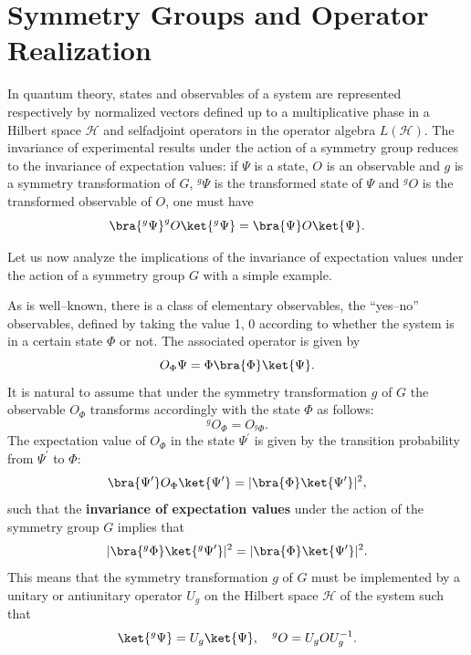 \begin{example}
\end{example}

\begin{example}
\end{example}

\section{Symmetry Groups and Operator Realization}

In quantum theory, states and observables of a system are represented respectively by normalized vectors defined up to a multiplicative phase in a Hilbert space \(\mathcal{H}\) and selfadjoint operators in the operator algebra \(L(\mathcal{H})\). The invariance of experimental results under the action of a symmetry group reduces to the invariance of expectation values: if \(\Psi\) is a state, \(O\) is an observable and \(g\) is a symmetry transformation of \(G\), \(^g \Psi\) is the transformed state of \(\Psi\) and \(^g O\) is the transformed observable of \(O\), one must have
\begin{equation}
    \bra{^g \Psi} ^g O \ket{^g \Psi} = \bra{\Psi} O \ket{\Psi}.
    \label{eq:group_invariance_expectation_value_definition}
\end{equation}

Let us now analyze the implications of the invariance of expectation values under the action of a symmetry group \(G\) with a simple example.

\begin{example}
    As is well–known, there is a class of elementary observables, the “yes–no” observables, defined by taking the value 1, 0 according to whether the system is in a certain state \(\Phi\) or not. The associated operator is given by
    \[
        O_{\Phi} \Psi = \Phi \bra{\Phi} \ket{\Psi}.
    \]
    It is natural to assume that under the symmetry transformation \(g\) of \(G\) the observable \(O_{\Phi}\) transforms accordingly with the state \(\Phi\) as follows:
    \[
        ^g O_{\Phi} = O_{^g \Phi}.
    \]
    The expectation value of \(O_{\Phi}\) in the state \(\Psi^{\prime}\) is given by the transition probability from \(\Psi^{\prime}\) to \(\Phi\):
    \[
        \bra{\Psi^{\prime}} O_{\Phi} \ket{\Psi^{\prime}} = |\bra{\Phi} \ket{\Psi^{\prime}}|^2,
    \]
    such that the \textbf{invariance of expectation values} under the action of the symmetry group \(G\) implies that
    \[
        |\bra{^g \Phi} \ket{^g \Psi^{\prime}}|^2 = |\bra{\Phi} \ket{\Psi^{\prime}}|^2.
    \]
    This means that the symmetry transformation \(g\) of \(G\) must be implemented by a unitary or antiunitary operator \(U_g\) on the Hilbert space \(\mathcal{H}\) of the system such that
    \[
        \ket{^g \Psi} = U_g \ket{\Psi}, \quad ^g O = U_g O U_g^{-1}.
    \]
\end{example}


